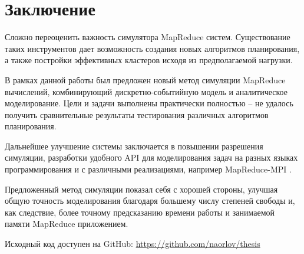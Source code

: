 \documentclass[../../thesis.tex]{subfile}
\begin{document}
    \section{Заключение}
    \label{sec:final}


    Сложно переоценить важность симулятора MapReduce систем. Существование таких
    инструментов дает возможность создания новых алгоритмов планирования, а
    также постройки эффективных кластеров исходя из предполагаемой нагрузки. 

    В рамках данной работы был предложен новый метод симуляции MapReduce
    вычислений, комбинирующий дискретно-событийную модель и аналитическое
    моделирование. Цели и задачи выполнены практически полностью -- не удалось
    получить сравнительные результаты тестирования различных алгоритмов
    планирования. 

    Дальнейшее улучшение системы заключается в повышении разрешения симуляции,
    разработки удобного API для моделирования задач на разных языках
    программирования и с различными реализациями, например MapReduce-MPI
    \cite{mapreduce_mpi}.

    Предложенный метод симуляции показал себя с хорошей стороны, улучшая общую
    точность моделирования благодаря большему числу степеней свободы и, как
    следствие, более точному предсказанию времени работы и занимаемой памяти
    MapReduce приложением.

    \bigskip
    \bigskip
    \bigskip
    \bigskip
    \bigskip
    \bigskip

    Исходный код доступен на GitHub: \url{https://github.com/naorlov/thesis}
\end{document}
